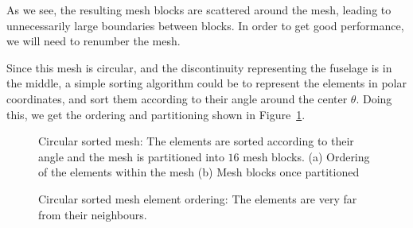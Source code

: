 As we see, the resulting mesh blocks are scattered around the mesh, leading to unnecessarily large
boundaries between blocks. In order to get good performance, we will need to renumber the mesh. 

Since this mesh is circular, and the discontinuity representing the fuselage is in the middle, a
simple sorting algorithm could be to represent the elements in polar coordinates, and sort them
according to their angle around the center \(\theta \). Doing this, we get the ordering and
partitioning shown in Figure~\ref{fig:mesh_circular}.

\begin{figure}[H]
	\centering
	\caption{Circular sorted mesh: The elements are sorted according to their angle and the mesh is partitioned into \(16\) mesh blocks. (a) Ordering of the elements within the mesh (b) Mesh blocks once partitioned}\label{fig:mesh_circular}
\end{figure}


\begin{figure}[H]
	\centering
	
	\caption{Circular sorted mesh element ordering: The elements are very far from their neighbours.}\label{fig:mesh_circular_ordering}
\end{figure}

